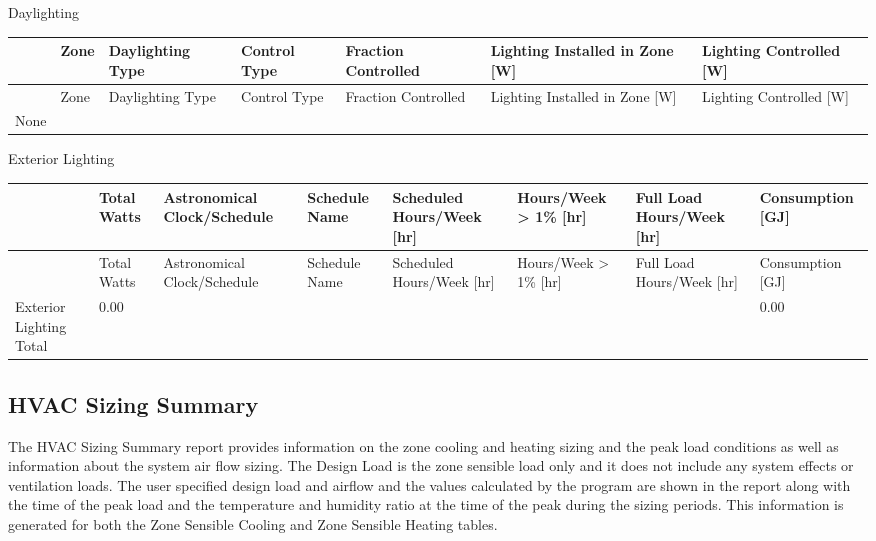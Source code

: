 Daylighting

\begin{longtable}[c]{p{0.85in}p{0.85in}p{0.85in}p{0.85in}p{0.85in}p{0.85in}p{0.85in}}
\toprule
 & Zone & Daylighting Type & Control Type & Fraction Controlled & Lighting Installed in Zone [W] & Lighting Controlled [W] \tabularnewline
\midrule
\endfirsthead

\toprule
 & Zone & Daylighting Type & Control Type & Fraction Controlled & Lighting Installed in Zone [W] & Lighting Controlled [W] \tabularnewline
\midrule
\endhead

None & ~ & ~ & ~ & ~ & ~ & ~ \tabularnewline
\bottomrule
\end{longtable}

Exterior Lighting

\begin{longtable}[c]{>{\raggedright}p{0.75in}>{\raggedright}p{0.75in}>{\raggedright}p{0.75in}>{\raggedright}p{0.75in}>{\raggedright}p{0.75in}>{\raggedright}p{0.75in}>{\raggedright}p{0.75in}>{\raggedright}p{0.75in}}
\toprule
 & Total Watts & Astronomical Clock/Schedule & Schedule Name & Scheduled Hours/Week [hr] & Hours/Week  >  1\% [hr] & Full Load Hours/Week [hr] & Consumption [GJ] \tabularnewline
\midrule
\endfirsthead

\toprule
 & Total Watts & Astronomical Clock/Schedule & Schedule Name & Scheduled Hours/Week [hr] & Hours/Week  >  1\% [hr] & Full Load Hours/Week [hr] & Consumption [GJ] \tabularnewline
\midrule
\endhead

Exterior Lighting Total & 0.00 & ~ & ~ & ~ & ~ & ~ & 0.00 \tabularnewline
\bottomrule
\end{longtable}

\subsection{HVAC Sizing Summary}\label{hvac-sizing-summary}

The HVAC Sizing Summary report provides information on the zone cooling and heating sizing and the peak load conditions as well as information about the system air flow sizing. The Design Load is the zone sensible load only and it does not include any system effects or ventilation loads. The user specified design load and airflow and the values calculated by the program are shown in the report along with the time of the peak load and the temperature and humidity ratio at the time of the peak during the sizing periods. This information is generated for both the Zone Sensible Cooling and Zone Sensible Heating tables.

